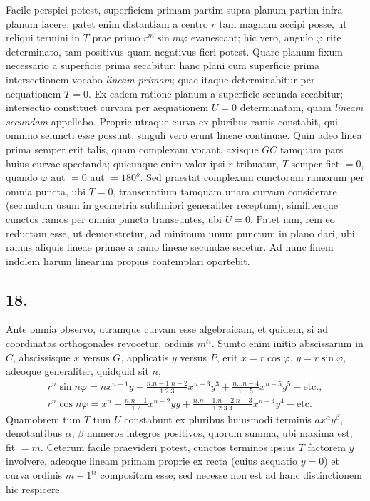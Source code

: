 \documentclass[twoside,12pt, showframe]{memoir}
\begin{document}
Facile perspici potest, superficiem primam partim supra planum partim infra planum iacere; patet enim distantiam a centro \(r\) tam magnam accipi posse, ut reliqui termini in \(T\) prae primo \(r^m \sin m \varphi\) evanescant; hic vero, angulo \(\varphi\) rite determinato, tam positivus quam negativus fieri potest. Quare planum fixum necessario a superficie prima secabitur; hanc plani cum superficie prima intersectionem vocabo \textit{lineam primam}; quae itaque determinabitur per aequationem \(T = 0\). Ex eadem ratione planum a superficie secunda secabitur; intersectio constituet curvam per aequationem \(U = 0\) determinatam, quam \textit{lineam secundam} appellabo. Proprie utraque curva ex pluribus ramis constabit, qui omnino seiuncti esse possunt, singuli vero erunt lineae continuae. Quin adeo linea prima semper erit talis, quam complexam vocant, axisque \(GC\) tamquam pars huius curvae spectanda; quicunque enim valor ipsi \(r\) tribuatur, \(T\) semper fiet \(= 0\), quando \(\varphi\) aut \(= 0\) aut \(= 180^o\). Sed praestat complexum cunctorum ramorum per omnia puncta, ubi \(T = 0\), transeuntium tamquam unam curvam considerare (secundum usum in geometria sublimiori generaliter receptum), similiterque cunctos ramos per omnia puncta transeuntes, ubi \(U=0\). Patet iam, rem eo reductam esse, ut demonstretur, ad minimum unum punctum in plano dari, ubi ramus aliquis lineae primae a ramo lineae secundae secetur. Ad hunc finem indolem harum linearum propius contemplari oportebit.

\subsection*{18.}

Ante omnia observo, utramque curvam esse algebraicam, et quidem, si ad coordinatas orthogonales revocetur, ordinis \(m^{ti}\).   Sumto enim initio abscissarum in \(C\), abscissisque \(x\) versus \(G\), applicatis \(y\) versus \(P\), erit \(x = r \cos \varphi\), \(y = r \sin \varphi \), adeoque generaliter, quidquid sit \(n\), \begin{align*} r^n \sin n \varphi = nx^{n-1}y - \tfrac{n . n-1 . n-2}{1 . 2 . 3} x^{n-3} y^3 + \tfrac{n \dots n-4}{1 \dots . 5} x^{n-5}y^5 - \text{etc{.}}, \\ r^n \cos n \varphi = x^n - \tfrac{n . n-1}{1 . 2} x^{n-2} yy + \tfrac{n . n-1 . n-2 . n-3 }{ 1 . 2 . 3 . 4} x^{n-4}y^4 - \text{etc{.}} \end{align*} Quamobrem tum \(T\) tum \(U\) constabunt ex pluribus huiusmodi terminis \(a x^{\alpha} y^{\beta} \), denotantibus \(\alpha\), \(\beta\) numeros integros positivos, quorum summa, ubi maxima est, fit \(= m\). Ceterum facile praevideri potest, cunctos terminos ipsius \(T\) factorem \(y\) involvere, adeoque lineam primam proprie ex recta (cuius aequatio \(y = 0\)) et curva ordinis \({m-1}^{ti}\) compositam esse; sed necesse non est ad hanc distinctionem hic respicere.
\end{document}
